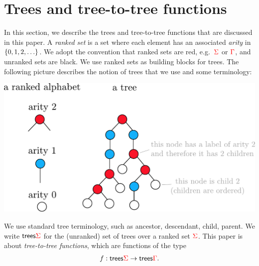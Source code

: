\section{Trees and tree-to-tree functions}
\label{sec:trees-transductions}
 In this section, we describe the trees and tree-to-tree functions that are discussed in this paper. 
A \emph{ranked set} is a set where each element has an associated \emph{arity} in $\{0,1,2,\ldots\}$. We adopt the convention that ranked sets are red, e.g.~${\color{red}{\Sigma}}$ or ${\color{red}{\Gamma}}$, and unranked sets are black.  We use ranked sets as building blocks for trees. The following picture describes the notion of trees that we use and some terminology:\\
\begin{center}
\includegraphics[scale=.35]{ranked-tree.pdf}
\end{center}


We use standard tree terminology, such as ancestor, descendant, child, parent. We write $\mathsf {trees} {\color{red}{\Sigma}}$ for the (unranked) set of trees over a ranked set ${\color{red}{\Sigma}}$. This paper is about \emph{tree-to-tree functions}, which are functions of the type \begin{align*}
f : \mathsf {trees} {\color{red}{\Sigma}} \to \mathsf {trees} {\color{red}{\Gamma}}.
\end{align*}

